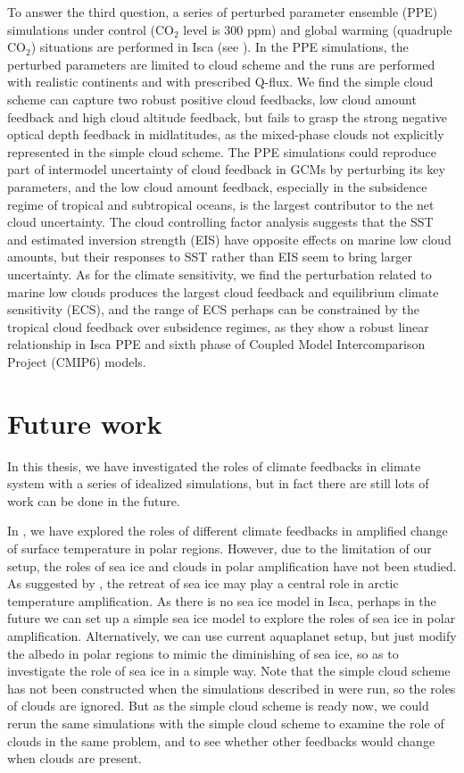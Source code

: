To answer the third question, a series of perturbed parameter ensemble (PPE) simulations under control (CO$_2$ level is 300 ppm) and global warming (quadruple CO$_2$) situations are performed in Isca (see ). In the PPE simulations, the perturbed parameters are limited to cloud scheme and the runs are performed with realistic continents and with prescribed Q-flux. We find the simple cloud scheme can capture two robust positive cloud feedbacks, low cloud amount feedback and high cloud altitude feedback, but fails to grasp the strong negative optical depth feedback in midlatitudes, as the mixed-phase clouds not explicitly represented in the simple cloud scheme. The PPE simulations could reproduce part of intermodel uncertainty of cloud feedback in GCMs by perturbing its key parameters, and the low cloud amount feedback, especially in the subsidence regime of tropical and subtropical oceans, is the largest contributor to the net cloud uncertainty. The cloud controlling factor analysis suggests that the SST and estimated inversion strength (EIS) have opposite effects on marine low cloud amounts, but their responses to SST rather than EIS seem to bring larger uncertainty. As for the climate sensitivity, we find the perturbation related to marine low clouds produces the largest cloud feedback and equilibrium climate sensitivity (ECS), and the range of ECS perhaps can be constrained by the tropical cloud feedback over subsidence regimes, as they show a robust linear relationship in Isca PPE and sixth phase of Coupled Model Intercomparison Project (CMIP6) models.

\section{Future work}

In this thesis, we have investigated the 
roles of climate feedbacks in climate system with a series of idealized simulations, but in fact there are still lots of work can be done in the future.

In , we have explored the roles of different climate feedbacks in amplified change of surface temperature in polar regions. However, due to the limitation of our setup, the roles of sea ice and clouds in polar amplification have not been studied. As suggested by \cite{Screen2010}, the retreat of sea ice may play a central role in arctic temperature amplification. As there is no sea ice model in Isca, perhaps in the future we can set up a simple sea ice model to explore the roles of sea ice in polar amplification. Alternatively, we can use current aquaplanet setup, but just modify the albedo in polar regions to mimic the diminishing of sea ice, so as to investigate the role of sea ice in a simple way. Note that the simple cloud scheme has not been constructed when the simulations described in  were run, so the roles of clouds are ignored. But as the simple cloud scheme is ready now, we could rerun the same simulations with the simple cloud scheme to examine the role of clouds in the same problem, and to see whether other feedbacks would change when clouds are present.

